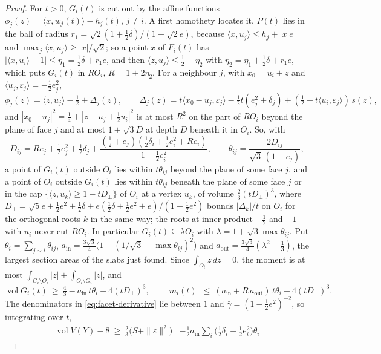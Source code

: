 \documentclass[11pt,reqno]{amsart}
\renewcommand{\_}{\origunderscore\allowbreak}
\numberwithin{equation}{section}
\theoremstyle{plain}
\theoremstyle{definition}
\theoremstyle{remark}
\DeclareMathOperator{\vol}{vol}
\begin{document}
\begin{proof}
For $t>0$, $G_i(t)$ is cut out by the affine functions
$\phi_j(z)=\langle x,w_j(t)\rangle-h_j(t)$, $j\ne i$. A first homothety
locates it. $P(t)$ lies in the ball of radius
$r_1=\sqrt2(1+\frac12\delta)/(1-\sqrt2e)$, because
$\langle x,u_j\rangle\le h_j+|x|e$ and $\max_j\langle x,u_j\rangle\ge|x|/\sqrt2$; so
a point $x$ of $F_i(t)$ has $|\langle x,u_i\rangle-1|\le\eta_1=\frac12\delta+r_1e$,
and then $\langle z,u_j\rangle\le\frac12+\eta_2$ with
$\eta_2=\eta_1+\frac12\delta+r_1e$, which puts $G_i(t)$ in $RO_i$,
$R=1+2\eta_2$. For a neighbour $j$, with $x_0=u_i+z$ and
$\langle u_j,\varepsilon_j\rangle=-\frac12e_j^2$,
\[
  \phi_j(z)=\langle z,u_j\rangle-\tfrac12+\Delta_j(z),\qquad
  \Delta_j(z)=t\langle x_0-u_j,\varepsilon_j\rangle-\tfrac12t(e_j^2+\delta_j)
  +(\tfrac12+t\langle u_i,\varepsilon_j\rangle)\,s(z),
\]
and $|x_0-u_j|^2=\frac14+|z-u_j+\frac12u_i|^2$ is at most $R^2$ on the part
of $RO_i$ beyond the plane of face $j$ and at most $1+\sqrt3D$ at depth $D$
beneath it in $O_i$. So, with
\[
  D_{ij}=Re_j+\tfrac12e_j^2+\tfrac12\delta_j
  +\frac{(\frac12+e_j)(\frac12\delta_i+\frac12e_i^2+Re_i)}{1-\frac12e_i^2},\qquad
  \theta_{ij}=\frac{2D_{ij}}{\sqrt3\,(1-e_j)},
\]
a point of $G_i(t)$ outside $O_i$ lies within $t\theta_{ij}$ beyond the plane
of some face $j$, and a point of $O_i$ outside $G_i(t)$ lies within
$t\theta_{ij}$ beneath the plane of some face $j$ or in the cap
$\{\langle z,u_k\rangle\ge1-tD_\perp\}$ of $O_i$ at a vertex $u_k$, of volume
$\frac23(tD_\perp)^3$, where
$D_\perp=\sqrt5e+\frac12e^2+\frac12\delta+e(\frac12\delta+\frac12e^2+e)/(1-\frac12e^2)$
bounds $|\Delta_k|/t$ on $O_i$ for the orthogonal roots $k$ in the same way;
the roots at inner product $-\frac12$ and $-1$ with $u_i$ never cut $RO_i$.
In particular $G_i(t)\subseteq\lambda O_i$ with
$\lambda=1+\sqrt3\max\theta_{ij}$. Put $\theta_i=\sum_{j\sim i}\theta_{ij}$,
$a_{\mathrm{in}}=\frac{3\sqrt3}4\bigl(1-(1/\sqrt3-\max\theta_{ij})^2\bigr)$ and
$a_{\mathrm{out}}=\frac{3\sqrt3}4(\lambda^2-\frac13)$, the largest section areas
of the slabs just found. Since $\int_{O_i}z\,dz=0$, the moment is at most
$\int_{G_i\setminus O_i}|z|+\int_{O_i\setminus G_i}|z|$, and
\[
  \vol G_i(t)\ \ge\ \tfrac43-a_{\mathrm{in}}\,t\theta_i-4(tD_\perp)^3,\qquad
  |m_i(t)|\ \le\ (a_{\mathrm{in}}+R\,a_{\mathrm{out}})\,t\theta_i+4(tD_\perp)^3 .
\]
The denominators in \eqref{eq:facet-derivative} lie between $1$ and
$\bar\gamma=(1-\frac12e^2)^{-2}$, so integrating over $t$,
\begin{align*}
  \vol V(Y)-8\ \ge\ \tfrac23\bigl(S+\|\varepsilon\|^2\bigr)
  &-\tfrac12a_{\mathrm{in}}\sum_i\bigl(\tfrac12\delta_i+\tfrac12e_i^2\bigr)\theta_i

\end{align*}
\end{proof}
\end{document}
